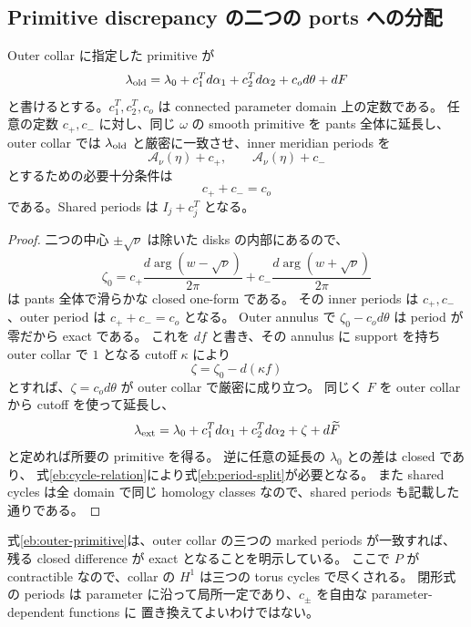\subsection{Primitive discrepancy の二つの ports への分配}

\begin{proposition}\label{eb:primitive-split}
Outer collar に指定した primitive が
\begin{equation}\label{eb:outer-primitive}
 \lambda_{\rm old}
 =\lambda_0+c_1^T d\alpha_1+c_2^T d\alpha_2+c_o d\theta+dF
\end{equation}
と書けるとする。$c_1^T,c_2^T,c_o$ は connected parameter domain 上の定数である。
任意の定数 $c_+,c_-$ に対し、同じ $\omega$ の smooth primitive を pants 全体に延長し、
outer collar では $\lambda_{\rm old}$ と厳密に一致させ、inner meridian periods を
\begin{equation}\label{eb:inner-periods}
 \mathcal A_\nu(\eta)+c_+,\qquad \mathcal A_\nu(\eta)+c_-
\end{equation}
とするための必要十分条件は
\begin{equation}\label{eb:period-split}
 c_++c_-=c_o
\end{equation}
である。Shared periods は $I_j+c_j^T$ となる。
\end{proposition}

\begin{proof}
二つの中心 $\pm\sqrt\nu$ は除いた disks の内部にあるので、
\[
 \zeta_0=c_+\frac{d\arg(w-\sqrt\nu)}{2\pi}
            +c_-\frac{d\arg(w+\sqrt\nu)}{2\pi}
\]
は pants 全体で滑らかな closed one-form である。
その inner periods は $c_+,c_-$、outer period は $c_++c_-=c_o$ となる。
Outer annulus で $\zeta_0-c_o d\theta$ は period が零だから exact である。
これを $df$ と書き、その annulus に support を持ち outer collar で $1$ となる cutoff $\kappa$ により
\[
 \zeta=\zeta_0-d(\kappa f)
\]
とすれば、$\zeta=c_o d\theta$ が outer collar で厳密に成り立つ。
同じく $F$ を outer collar から cutoff を使って延長し、
\[
 \lambda_{\rm ext}
 =\lambda_0+c_1^T d\alpha_1+c_2^T d\alpha_2+\zeta+d\widetilde F
\]
と定めれば所要の primitive を得る。
逆に任意の延長の $\lambda_0$ との差は closed であり、
式\eqref{eb:cycle-relation}により式\eqref{eb:period-split}が必要となる。
また shared cycles は全 domain で同じ homology classes なので、shared periods も記載した通りである。
\end{proof}

式\eqref{eb:outer-primitive}は、outer collar の三つの marked periods が一致すれば、
残る closed difference が exact となることを明示している。
ここで $P$ が contractible なので、collar の $H^1$ は三つの torus cycles で尽くされる。
閉形式の periods は parameter に沿って局所一定であり、$c_\pm$ を自由な parameter-dependent functions に
置き換えてよいわけではない。

